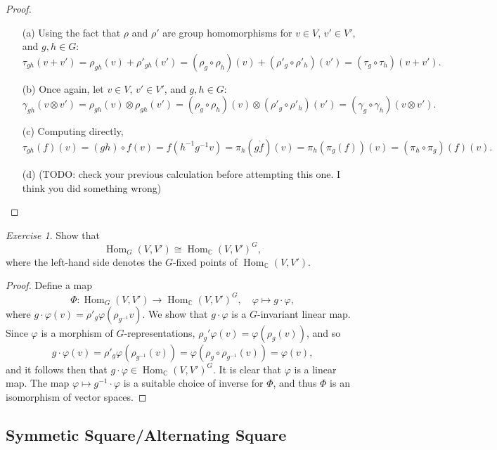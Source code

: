 \documentclass[a4paper]{report}
\theoremstyle{definition}
\theoremstyle{remark}
\theoremstyle{proposition}
\theoremstyle{conjecture}
\theoremstyle{lemma}
\theoremstyle{corollary}
\theoremstyle{exercise}
\newtheorem{exercise}{Exercise}
\theoremstyle{example}
\newcommand{\C}{\mathbb{C}}
\newcommand{\on}{\operatorname}
\begin{document}
\begin{proof}
    \leavevmode
    \begin{itemize}
        \item[(a)] Using the fact that $\rho$ and $\rho'$ are 
            group homomorphisms for $v\in V$, $v'\in V'$, and $g,h\in G$:
            $$\tau_{gh}(v+v') = \rho_{gh}(v) + \rho'_{gh}(v') = (\rho_g\circ \rho_h)(v) + (\rho'_g \circ \rho'_h)(v') = (\tau_g\circ \tau_h)(v+v').$$
        \item[(b)] Once again, let $v\in V$, $v'\in V'$, and $g,h\in G$:
            $$\gamma_{gh}(v\otimes v') = \rho_{gh}(v)\otimes \rho_{gh}(v') = (\rho_g \circ \rho_h)(v) \otimes (\rho'_g\circ \rho'_h)(v') = (\gamma_g \circ \gamma_h)(v\otimes v').$$
        \item[(c)] Computing directly,
            $$\tau_{gh}(f)(v) = (gh)\circ f(v) = f(h^{-1}g^{-1}v) = \pi_h(g\dot f)(v) = \pi_h(\pi_g(f))(v) = (\pi_h\circ \pi_g)(f)(v).$$
        \item[(d)] (TODO: check your previous calculation before attempting 
            this one. I think you did something wrong)
    \end{itemize}
\end{proof}

\begin{exercise}
    Show that $$\on{Hom}_G(V,V') \cong \on{Hom}_\C(V,V')^G,$$
    where the left-hand side denotes the $G$-fixed points of $\on{Hom}_\C(V,V')$.
\end{exercise}

\begin{proof}
    Define a map 
    $$\Phi : \on{Hom}_G(V,V') \longrightarrow \on{Hom}_\C(V,V')^G,\quad \varphi \longmapsto g\cdot \varphi,$$
    where $g\cdot \varphi(v) = \rho'_g\varphi(\rho_{g^{-1}}v)$. 
    We show that $g\cdot \varphi$ is a $G$-invariant linear map.
    Since $\varphi$ is a morphism of $G$-representations,
    $\rho_g'\varphi(v) = \varphi(\rho_g(v))$, and so
    $$g\cdot \varphi(v) = \rho'_g\varphi(\rho_{g^{-1}}(v)) = \varphi(\rho_g\circ \rho_{g^{-1}}(v)) = \varphi(v),$$
    and it follows then that $g\cdot \varphi \in \on{Hom}_\C(V,V')^G$.
    It is clear that $\varphi$ is a linear map. The map 
    $\varphi \mapsto g^{-1}\cdot \varphi$ is a suitable choice of 
    inverse for $\Phi$, and thus $\Phi$ is an isomorphism of vector spaces.
\end{proof}

\subsection{Symmetic Square/Alternating Square}
\end{document}
